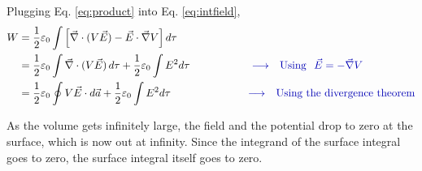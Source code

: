 \documentclass[12pt]{article}
\begin{document}
\begin{flushleft}
Plugging Eq. \ref{eq:product} into Eq. \ref{eq:intfield},
\begin{equation*}
\begin{aligned}
W & = \frac{1}{2}\varepsilon_{0} \int \left[ \vec{\nabla} \cdot (V\vec{E}) - \vec{E} \cdot \vec{\nabla}V \right] d\tau \\
& = \frac{1}{2}\varepsilon_{0} \int \vec{\nabla} \cdot (V\vec{E}) \, d\tau + \frac{1}{2}\varepsilon_{0}\int E^{2}  d\tau \hspace{.8in}  {\color{myblue} \longrightarrow \hspace{.1in} \mbox{Using} \hspace{.1in} \vec{E} =-\vec{\nabla}V} \\
& = \frac{1}{2}\varepsilon_{0} \oint V\vec{E} \cdot d\vec{a} + \frac{1}{2}\varepsilon_{0}\int E^{2}  d\tau \hspace{1.in}  {\color{myblue} \longrightarrow \hspace{.1in} \mbox{Using the divergence theorem}}
\end{aligned}
\end{equation*}

 As the volume gets infinitely large, the field and the potential drop to zero at the surface, which is now out at infinity.  Since the integrand of the surface integral goes to zero, the surface integral itself goes to zero.
 
\end{flushleft}
\end{document}
